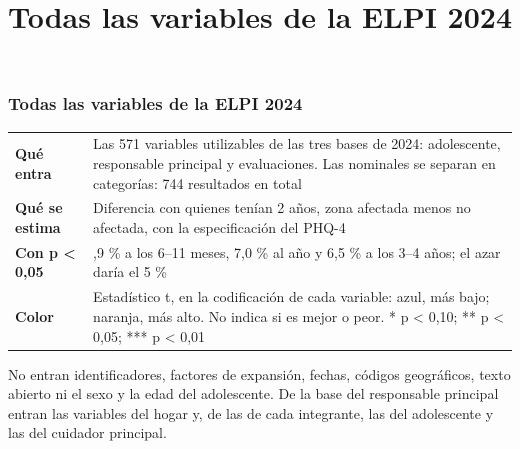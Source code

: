 \documentclass[aspectratio=169,11pt]{beamer}
\title{Todas las variables de la ELPI 2024}
\newcommand{\nota}[1]{\vfill\noindent\parbox{0.9\textwidth}{\raggedright\scriptsize\color{muted}#1}\par\vspace*{1mm}}
\begin{document}
\begin{frame}
\frametitle{Todas las variables de la ELPI 2024}
\vspace{2mm}
{\small
\renewcommand{\arraystretch}{1.45}
\begin{tabular}{@{}>{\raggedright\arraybackslash}p{34mm}
                >{\raggedright\arraybackslash}p{104mm}@{}}
\textbf{Qué entra} & Las 571 variables utilizables de las tres bases de 2024:
  adolescente, responsable principal y evaluaciones. Las nominales se separan
  en categorías: 744 resultados en total \\
\textbf{Qué se estima} & Diferencia con quienes tenían 2 años, zona afectada
  menos no afectada, con la especificación del PHQ-4 \\
\textbf{Con p < 0,05} & 5,9 \% a los 6--11 meses, 7,0 \% al año y 6,5 \% a los
  3--4 años; el azar daría el 5 \% \\
\textbf{Color} & Estadístico t, en la codificación de cada variable: azul, más
  bajo; naranja, más alto. No indica si es mejor o peor. * p < 0,10;
  ** p < 0,05; *** p < 0,01 \\
\end{tabular}}

\nota{No entran identificadores, factores de expansión, fechas, códigos
geográficos, texto abierto ni el sexo y la edad del adolescente. De la base del
responsable principal entran las variables del hogar y, de las de cada
integrante, las del adolescente y las del cuidador principal.}
\end{frame}
\end{document}
